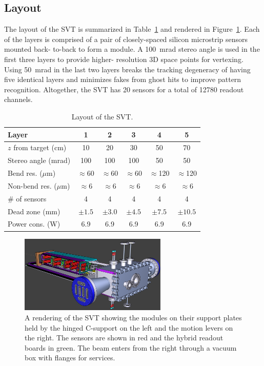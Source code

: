 \documentclass[final,3p,times,twocolumn]{elsarticle}
\begin{document}
\subsection{Layout}
The layout of the SVT is summarized in Table~\ref{tab:trk} and rendered in Figure~\ref{fig:tracker_model}. 
Each of the layers is comprised of a pair of closely-spaced silicon microstrip sensors mounted back-
to-back to form a module. A 100~mrad stereo angle is used in the first three layers to provide higher-
resolution 3D space points for vertexing.  Using 50~mrad in the last two layers breaks the tracking 
degeneracy of having five identical layers and minimizes fakes from ghost hits to improve pattern 
recognition. Altogether, the SVT has 20 sensors for a total of 12780 readout channels. 
\begin{center}
\begin{table}[ht]
{\footnotesize
\begin{tabular}{lccccc}   
\hline \hline 
    Layer & 1 & 2 & 3 & 4 & 5 \\      
\hline
    $z$ from target (cm)  & 10 & 20 & 30 & 50 & 70  \\ 
    Stereo angle (mrad)  & 100 & 100 & 100 & 50 & 50 \\ 
    Bend res. ($\mu$m)  & $\approx$60 & $\approx$60 & $\approx$60 & $\approx$120 & $\approx$120  \\ 
    Non-bend res. ($\mu$m)  & $\approx$6 & $\approx$6 & $\approx$6 & $\approx$6 & $\approx$6  \\ 
    \# of sensors  & 4 & 4 & 4 & 4 & 4  \\ 
    Dead zone (mm) & $\pm1.5$  & $\pm3.0$  & $\pm4.5$  & $\pm7.5$  & $\pm10.5$  \\ 
    Power cons. (W) & 6.9 & 6.9 & 6.9 & 6.9 & 6.9 \\
\hline \hline
\end{tabular}
\caption{\small Layout of the SVT.}
}
\label{tab:trk}
\vspace*{-15mm}
\end{table}
\end{center}
\begin{center}
\begin{figure}[htp]
\includegraphics[width=7cm]{figures/HPS_nochamber}
\caption{\small A rendering of the SVT showing the modules on their support plates held by the 
hinged C-support on the left and the motion levers on the right. The sensors are shown in red and the 
hybrid readout boards in green. The beam enters from the right through a vacuum box with flanges 
for services. }
\label{fig:tracker_model}
\end{figure}
\end{center}
\end{document}
